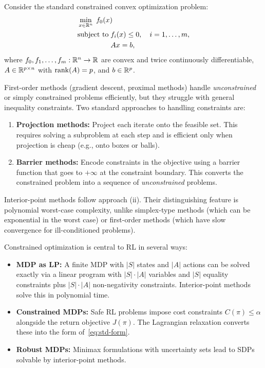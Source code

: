 \documentclass[11pt,a4paper]{article}
\begin{document}
Consider the standard constrained convex optimization problem:
\begin{equation}\label{eq:std-form}
\begin{aligned}
  &\min_{x \in \R^n}\; f_0(x) \\
  &\text{subject to}\; f_i(x) \le 0, \quad i = 1, \dots, m, \\
  &\phantom{\text{subject to}\;} Ax = b,
\end{aligned}
\end{equation}
where $f_0, f_1, \dots, f_m : \mathbb{R}^n \to \mathbb{R}$ are convex and twice
continuously differentiable, $A \in \mathbb{R}^{p \times n}$ with
$\operatorname{rank}(A) = p$, and $b \in \mathbb{R}^p$.

First-order methods (gradient descent, proximal methods) handle
\emph{unconstrained} or simply constrained problems efficiently, but
they struggle with general inequality constraints. Two standard
approaches to handling constraints are:

\begin{enumerate}[label=(\roman*)]
  \item \textbf{Projection methods:} Project each iterate onto the
    feasible set. This requires solving a subproblem at each step and
    is efficient only when projection is cheap (e.g., onto boxes
    or balls).
  \item \textbf{Barrier methods:} Encode constraints in the objective
    using a barrier function that goes to $+\infty$ at the constraint
    boundary. This converts the constrained problem into a sequence of
    \emph{unconstrained} problems.
\end{enumerate}

Interior-point methods follow approach (ii). Their distinguishing
feature is polynomial worst-case complexity, unlike simplex-type
methods (which can be exponential in the worst case) or first-order
methods (which have slow convergence for ill-conditioned problems).

\begin{rlconnection}[title={Constrained Optimization in RL}]
Constrained optimization is central to RL in several ways:
\begin{itemize}
  \item \textbf{MDP as LP:} A finite MDP with $|S|$ states and $|A|$
    actions can be solved exactly via a linear program with
    $|S| \cdot |A|$ variables and $|S|$ equality constraints plus
    $|S| \cdot |A|$ non-negativity constraints. Interior-point methods
    solve this in polynomial time.
  \item \textbf{Constrained MDPs:} Safe RL problems impose cost
    constraints $C(\pi) \le \alpha$ alongside the return objective
    $J(\pi)$. The Lagrangian relaxation converts these into the form
    of~\eqref{eq:std-form}.
  \item \textbf{Robust MDPs:} Minimax formulations with uncertainty
    sets lead to SDPs solvable by interior-point methods.
\end{itemize}
\end{rlconnection}
\end{document}
